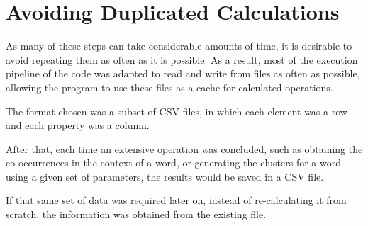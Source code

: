 \section{Avoiding Duplicated Calculations}

As many of these steps can take considerable amounts of time, it is desirable to
avoid repeating them as often as it is possible. As a result, most of the
execution pipeline of the code was adapted to read and write from files as often
as possible, allowing the program to use these files as a cache for calculated
operations.

The format chosen was a subset of \ac{CSV} files, in which each element was a
row and each property was a column.

After that, each time an extensive operation was concluded, such as obtaining
the co-occurrences in the context of a word, or generating the clusters for a
word using a given set of parameters, the results would be saved in a CSV file.

If that same set of data was required later on, instead of re-calculating it
from scratch, the information was obtained from the existing file.

